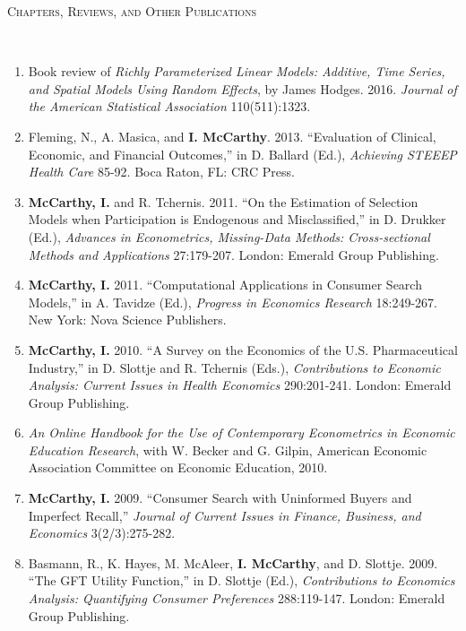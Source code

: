 \documentclass[9pt]{article}
\newenvironment{changemargin}[2]{%
  \begin{list}{}{%
    \setlength{\topsep}{0pt}%
    \setlength{\leftmargin}{#1}%
    \setlength{\rightmargin}{#2}%
    \setlength{\listparindent}{\parindent}%
    \setlength{\itemindent}{\parindent}%
    \setlength{\parsep}{\parskip}%
  }%
  \item[]}{\end{list}
}
\newcommand{\lineover}{
	\begin{changemargin}{-0.05in}{-0.05in}
		\vspace*{-8pt}
		\hrulefill \\
		\vspace*{-2pt}
	\end{changemargin}
}
\newcommand{\header}[1]{
	\begin{changemargin}{-0.5in}{-0.5in}
		\scshape{#1}\\
  	\lineover
	\end{changemargin}
}
\newenvironment{body} {
	\vspace*{-16pt}
	\begin{changemargin}{-0.25in}{-0.5in}
  }	
	{\end{changemargin}
}
\begin{document}
\header{Chapters, Reviews, and Other Publications}
\begin{body}
  \vspace{14pt}
  \begin{enumerate}
    \item Book review of \textit{Richly Parameterized Linear Models: Additive, Time Series, and Spatial Models Using Random Effects}, by James Hodges. 2016. \textit{Journal of the American Statistical Association} 110(511):1323.
    \item Fleming, N., A. Masica, and \textbf{I. McCarthy}. 2013. ``Evaluation of Clinical, Economic, and Financial Outcomes,'' in D. Ballard (Ed.), \textit{Achieving STEEEP Health Care} 85-92. Boca Raton, FL: CRC Press.
      \item \textbf{McCarthy, I.} and R. Tchernis. 2011. ``On the Estimation of Selection Models when Participation is Endogenous and Misclassified,'' in D. Drukker (Ed.), \textit{Advances in Econometrics, Missing-Data Methods: Cross-sectional Methods and Applications} 27:179-207. London: Emerald Group Publishing.
    \item \textbf{McCarthy, I.} 2011. ``Computational Applications in Consumer Search Models,'' in A. Tavidze (Ed.), \textit{Progress in Economics Research} 18:249-267. New York: Nova Science Publishers.
    \item \textbf{McCarthy, I.} 2010. ``A Survey on the Economics of the U.S. Pharmaceutical Industry,'' in D. Slottje and R. Tchernis (Eds.), \textit{Contributions to Economic Analysis: Current Issues in Health Economics} 290:201-241. London: Emerald Group Publishing.
    \item \textit{An Online Handbook for the Use of Contemporary Econometrics in Economic Education Research}, with W. Becker and G. Gilpin, American Economic Association Committee on Economic Education, 2010.
    \item \textbf{McCarthy, I.} 2009. ``Consumer Search with Uninformed Buyers and Imperfect Recall,'' \textit{Journal of Current Issues in Finance, Business, and Economics} 3(2/3):275-282.
    \item Basmann, R., K. Hayes, M. McAleer, \textbf{I. McCarthy}, and D. Slottje. 2009. ``The GFT Utility Function,'' in D. Slottje (Ed.), \textit{Contributions to Economics Analysis: Quantifying Consumer Preferences} 288:119-147. London: Emerald Group Publishing.
  \end{enumerate}
\end{body}
\smallskip
\end{document}
